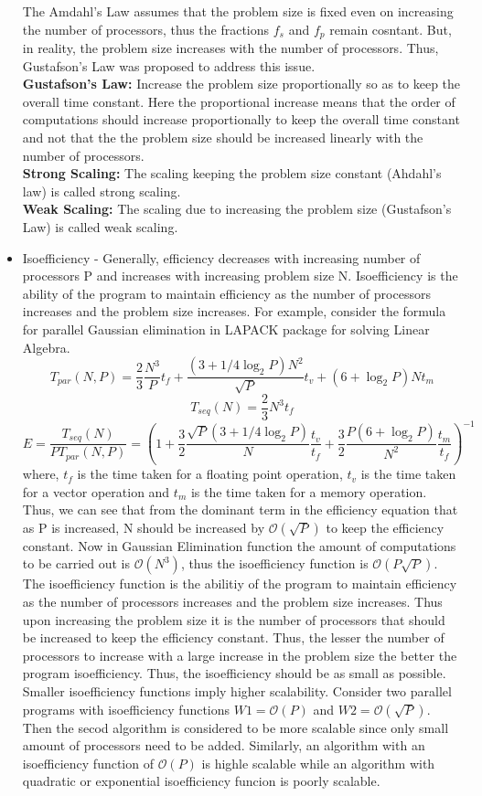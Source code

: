 \documentclass[12pt]{article}
\begin{document}
\begin{itemize}
    The Amdahl's Law assumes that the problem size is fixed even on increasing the number of processors, thus the fractions $f_s$ and $f_p$ remain cosntant. 
    But, in reality, the problem size increases with the number of processors. Thus, Gustafson's Law was proposed to address this issue.\\
    \textbf{Gustafson's Law: }Increase the problem size proportionally so as to keep the overall time constant. Here the proportional increase means that the order of computations should increase proportionally to keep the overall time constant
    and not that the the problem size should be increased linearly with the number of processors.\\
    \textbf{Strong Scaling: }The scaling keeping the problem size constant (Ahdahl's law) is called strong scaling.\\
    \textbf{Weak Scaling: }The scaling due to increasing the problem size (Gustafson's Law) is called weak scaling.
    \item Isoefficiency - Generally, efficiency decreases with increasing number of processors P and increases with increasing problem size N.
    Isoefficiency is the ability of the program to maintain efficiency as the number of processors increases and the problem size increases. For example, consider the formula for parallel Gaussian elimination in 
    LAPACK package for solving Linear Algebra.
    \[T_{par}(N,P)=\frac{2}{3} \frac{N^3}{P} t_f+ \frac{(3+1/4 \log_2 P)N^2}{\sqrt{P}}t_v+(6+ \log_2 P)Nt_m\]
    \[T_{seq}(N)=\frac{2}{3}N^3t_f\]
    \[E=\frac{T_{seq}(N)}{PT_{par}(N,P)}=(1+\frac{3}{2}\frac{\sqrt{P}(3+1/4\log_2 P)}{N}\frac{t_v}{t_f}+\frac{3}{2}\frac{P(6+\log_2 P)}{N^2}\frac{t_m}{t_f})^{-1}\]
    where, $t_f$ is the time taken for a floating point operation, $t_v$ is the time taken for a vector operation and $t_m$ is the time taken for a memory operation.
    Thus, we can see that from the dominant term in the efficiency equation that as P is increased, N should be increased by $\mathcal{O}(\sqrt{P})$ to keep the efficiency constant.
    Now in Gaussian Elimination function the amount of computations to be carried out is $\mathcal{O}(N^3)$, thus the isoefficiency function is $\mathcal{O}(P\sqrt{P})$. 
    The isoefficiency function is the abilitiy of the program to maintain efficiency as the number of processors increases and the problem size increases. Thus upon increasing the problem size it is
    the number of processors that should be increased to keep the efficiency constant. Thus, the lesser the number of processors to increase with a large increase in the problem size the better the program isoefficiency.
    Thus, the isoefficiency should be as small as possible. Smaller isoefficiency functions imply higher scalability. Consider two parallel programs with isoefficiency functions $W1=\mathcal{O}(P)$ 
    and $W2=\mathcal{O}(\sqrt{P})$. Then the secod algorithm is considered to be more scalable since only small amount of processors need to be added. Similarly, an algorithm with an isoefficiency 
    function of $\mathcal{O}(P)$ is highle scalable while an algorithm with quadratic or exponential isoefficiency funcion is poorly scalable.
\end{itemize}
\end{document}
